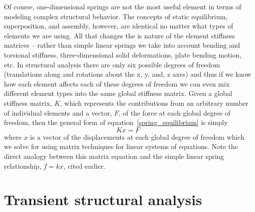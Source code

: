 Of course, one-dimensional springs are not the most useful element in
terms of modeling complex structural behavior.  The concepts of 
static equilibrium, superposition, and assembly, however, are identical no 
matter what types of elements we are using.  All that changes the is nature of 
the element stiffness matrices -- rather than simple linear springs we take into 
account bending and torsional stiffness, three-dimensional solid deformations,
plate bending motion, etc.    In structural analysis there are only six
possible degrees of freedom (translations along and rotations about the
x, y, and, z axes) and thus if we know how each element affects
each of these degrees of freedom we can even mix different element types
into the same global stiffness matrix.  Given a global stiffness matrix, $K$,
which represents the contributions from an arbitrary number of individual
elements and a vector, $F$, of the force at each global degree of
freedom, then the general form of equation~\ref{spring_equilibrium} is simply
\begin{equation}
Kx = F
\end{equation}
where $x$ is a vector of the displacements at each global degree of freedom
which we solve for using matrix techniques for linear systems of equations.
Note the direct analogy between this matrix equation and the simple linear
spring relationship, \mbox{$f = kx$}, cited earlier.

\section{Transient structural analysis}

